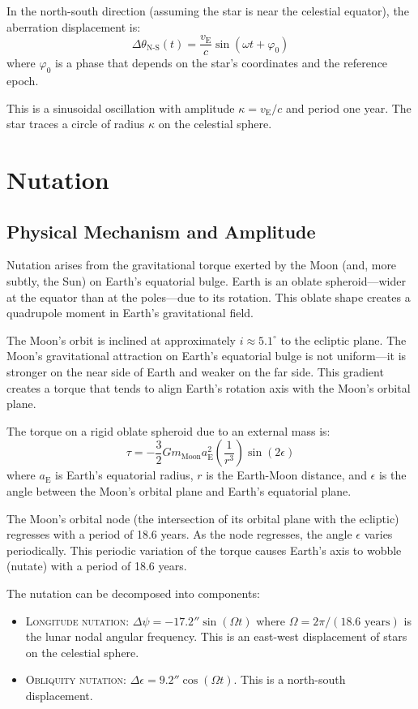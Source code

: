 In the north-south direction (assuming the star is near the celestial equator), the aberration displacement is:
\[
  \Delta \theta_{\text{N-S}}(t) = \frac{v_{\text{E}}}{c} \sin(\omega t + \varphi_0)
\]
where $\varphi_0$ is a phase that depends on the star's coordinates and the reference epoch.

This is a sinusoidal oscillation with amplitude $\kappa = v_{\text{E}}/c$ and period one year. The star traces a circle of radius $\kappa$ on the celestial sphere.

\section{Nutation}

\subsection*{Physical Mechanism and Amplitude}

Nutation arises from the gravitational torque exerted by the Moon (and, more subtly, the Sun) on Earth's equatorial bulge. Earth is an oblate spheroid—wider at the equator than at the poles—due to its rotation. This oblate shape creates a quadrupole moment in Earth's gravitational field.

The Moon's orbit is inclined at approximately $i \approx 5.1^{\circ}$ to the ecliptic plane. The Moon's gravitational attraction on Earth's equatorial bulge is not uniform—it is stronger on the near side of Earth and weaker on the far side. This gradient creates a torque that tends to align Earth's rotation axis with the Moon's orbital plane.

The torque on a rigid oblate spheroid due to an external mass is:
\[
  \tau = -\frac{3}{2} G m_{\text{Moon}} a_{\text{E}}^2 \left( \frac{1}{r^3} \right) \sin(2\epsilon)
\]
where $a_{\text{E}}$ is Earth's equatorial radius, $r$ is the Earth-Moon distance, and $\epsilon$ is the angle between the Moon's orbital plane and Earth's equatorial plane.

The Moon's orbital node (the intersection of its orbital plane with the ecliptic) regresses with a period of 18.6 years. As the node regresses, the angle $\epsilon$ varies periodically. This periodic variation of the torque causes Earth's axis to wobble (nutate) with a period of 18.6 years.

The nutation can be decomposed into components:
\begin{itemize}
  \item \textsc{Longitude nutation:} $\Delta \psi = -17.2'' \sin(\Omega t)$ where $\Omega = 2\pi / (18.6 \text{ years})$ is the lunar nodal angular frequency. This is an east-west displacement of stars on the celestial sphere.
  \item \textsc{Obliquity nutation:} $\Delta \epsilon = 9.2'' \cos(\Omega t)$. This is a north-south displacement.
\end{itemize}

